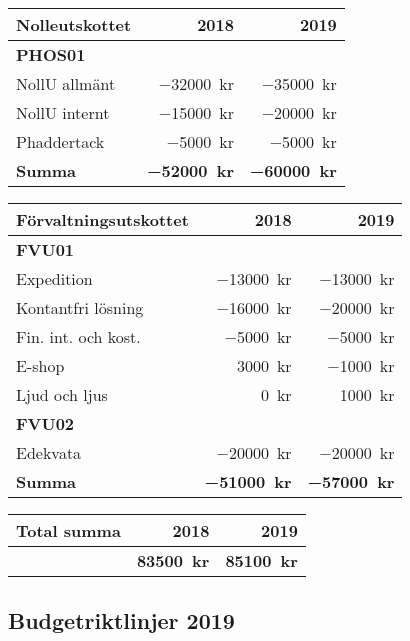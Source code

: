 \documentclass[10pt]{article}
\begin{document}
    \begin{tabularx}{10cm}{X r r}
        \textbf{\large Nolleutskottet} & \textbf{2018} & \textbf{2019} \\
        \hline
        \textbf{PHOS01} \\
        NollU allmänt & \SI{-32000}{kr} & \SI{-35000}{kr} \\
        NollU internt & \SI{-15000}{kr} & \SI{-20000}{kr} \\
        Phaddertack & \SI{-5000}{kr} & \SI{-5000}{kr} \\
        \hline
        \textbf{Summa} & \textbf{\SI{-52000}{kr}} & \textbf{\SI{-60000}{kr}} \\
    \end{tabularx}
    
    \begin{tabularx}{10cm}{X r r}
        \textbf{\large Förvaltningsutskottet} & \textbf{2018} & \textbf{2019} \\
        \hline
        \textbf{FVU01} \\
        Expedition & \SI{-13000}{kr} & \SI{-13000}{kr} \\
        Kontantfri lösning & \SI{-16000}{kr} & \SI{-20000}{kr} \\
        Fin. int. och kost. & \SI{-5000}{kr} & \SI{-5000}{kr} \\
        E-shop & \SI{3000}{kr} & \SI{-1000}{kr} \\
        Ljud och ljus & \SI{0}{kr} & \SI{1000}{kr}\\
        \textbf{FVU02} \\
        Edekvata & \SI{-20000}{kr} & \SI{-20000}{kr} \\
        \hline
        \textbf{Summa} & \textbf{\SI{-51000}{kr}} & \textbf{\SI{-57000}{kr}} \\
    \end{tabularx}
    
    \begin{tabularx}{10cm}{X r r}
        \textbf{\large Total summa} & \textbf{2018} & \textbf{2019} \\
        \hline
         & \textbf{\SI{83500}{kr}} & \textbf{\SI{85100}{kr}} \\
    \end{tabularx}
    
    
    \newpage
    \subsection*{Budgetriktlinjer 2019}
    
\end{document}
